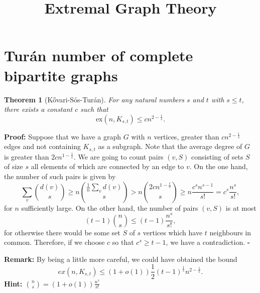 \documentclass[12pt]{article}
\title{Extremal Graph Theory}
\author{}
\date{}
\newtheorem{theorem}{Theorem}
\begin{document}
	\maketitle
	\section{Tur\'an number of complete bipartite graphs}
		\begin{theorem}[K\H{o}vari-S\'os-Tur\'an]
			For any natural numbers $s$ and $t$ with $s \leq t$, there exists a constant $c$ such that 
			\[
			\mathrm{ex}(n, K_{s,t}) \leq c n^{2 - \frac{1}{s}}.
			\]
		\end{theorem}
	{\bf Proof:}
			Suppose that we have a graph $G$ with $n$ vertices, greater than $c n^{2 - \frac{1}{s}}$ edges and not containing $K_{s,t}$ as a subgraph. Note that the average degree of $G$ is greater than $2c n^{1 - \frac{1}{s}}$. We are going to count pairs $(v, S)$ consisting of sets $S$ of size $s$ all elements of which are connected by an edge to $v$. On the one hand, the number of such pairs is given by 
			\[
			\sum_{v} \binom{d(v)}{s} \geq n  \binom{\frac{1}{n} \sum_{v}d(v)}{s}> n  \binom{2cn^{1-\frac{1}{s}}}{s} \geq n \frac{c^{s} n^{s - 1}}{s!} = c^{s} \frac{n^{s}}{s!},
			\]
			for $n$ sufficiently large. On the other hand, the number of pairs $(v, S)$ is at most 
			\[
			(t - 1) \binom{n}{s} \leq (t - 1) \frac{n^{s}}{s!},
			\]
			for otherwise there would be some set $S$ of $s$ vertices which have $t$ neighbours in common. Therefore, if we choose $c$ so that $c^{s} \geq t - 1$, we have a contradiction. \hfill$\square$
			
		{\bf Remark:} By being a little more careful, we could have obtained the bound
			\[
			ex(n, K_{s,t}) \leq (1 + o(1))\frac{1}{2}(t - 1)^{\frac{1}{s}} n^{2 - \frac{1}{s}}.
			\]
			{\small \bf Hint: $\binom{n}{s}=(1+o(1))\tfrac{n^s}{s!}$}
\end{document}
